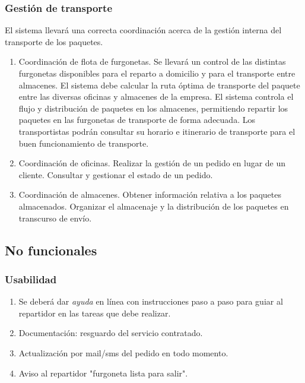 \subsubsection{Gestión de transporte}
El sistema llevará una correcta coordinación acerca de la gestión interna del transporte de los paquetes.
\begin{enumerate}
	\item Coordinación de flota de furgonetas.
	\subitem Se llevará un control de las distintas furgonetas disponibles para el reparto a domicilio y para el transporte entre almacenes.
	\subitem El sistema debe calcular la ruta óptima de transporte del paquete entre las diversas oficinas y almacenes de la empresa. 
	\subitem El sistema controla el flujo y distribución de paquetes en los almacenes, permitiendo repartir los paquetes en las furgonetas de transporte de forma adecuada.
 	\subitem Los transportistas podrán consultar su horario e itinerario de transporte para el buen funcionamiento de transporte.

	\item Coordinación de oficinas.
	\subitem Realizar la gestión de un pedido en lugar de un cliente.
	\subitem Consultar y gestionar el estado de un pedido.
	
	\item Coordinación de almacenes.
	\subitem Obtener información relativa a los paquetes almacenados.
	\subitem Organizar el almacenaje y la distribución de los paquetes en transcurso de envío.


\end{enumerate}

\subsection{No funcionales}
\subsubsection{Usabilidad}
\begin{enumerate}
	\item Se deberá dar \textit{ayuda} en línea con instrucciones paso a paso para guiar al repartidor en las tareas que debe realizar.
	\item Documentación: resguardo del servicio contratado.
	\item Actualización por mail/sms del pedido en todo momento.
	\item Aviso al repartidor "furgoneta lista para salir".
	
\end{enumerate}
